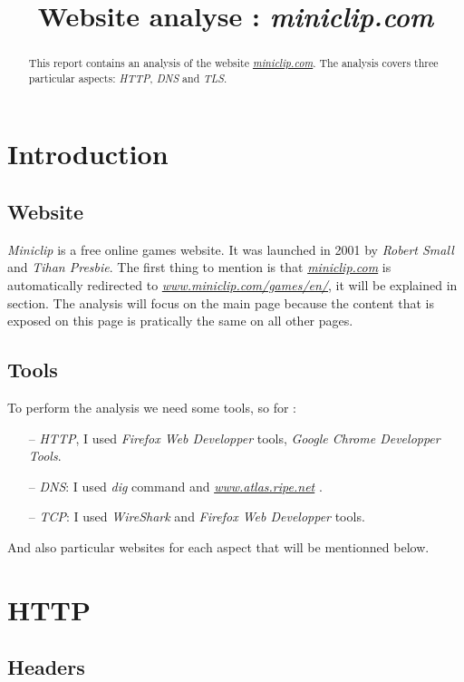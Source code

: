 \documentclass{article}
\title{Website analyse : \textit{miniclip.com}}
\newcommand{\link}[1]{\href{#1}{\textit{#1}}}
\begin{document}
%
\maketitle
%
\begin{abstract}
This report contains an analysis of the website \link{miniclip.com}. The analysis covers three particular aspects: \textit{HTTP}, \textit{DNS} and \textit{TLS}.
\end{abstract}
%
%
\section{Introduction}
\label{sec:intro}
\subsection{Website}
\label{sub:web}
\textit{Miniclip} is a free online games website. It was launched in 2001 by \textit{Robert Small} and \textit{Tihan Presbie}. The first thing to mention is that \link{miniclip.com} is automatically redirected to \link{www.miniclip.com/games/en/}, it will be explained in \textbf{} section. The analysis will focus on the main page because the content that is exposed on this page is pratically the same on all other pages. 
\subsection{Tools}
\label{sub:tools}
To perform the analysis we need some tools, so for :
\begin{itemize}
    \item[--] \textit{HTTP}, I used \textit{Firefox Web Developper} tools, \textit{Google Chrome Developper Tools}.
    \item[--] \textit{DNS}: I used \textit{dig} command and \link{www.atlas.ripe.net} .
    \item[--] \textit{TCP}: I used \textit{WireShark} and \textit{Firefox Web Developper} tools.
\end{itemize}
And also particular websites for each aspect that will be mentionned below.

\section{HTTP}
\label{sec:HTTP}

\subsection{Headers}
\label{sub:headers}
\end{document}
